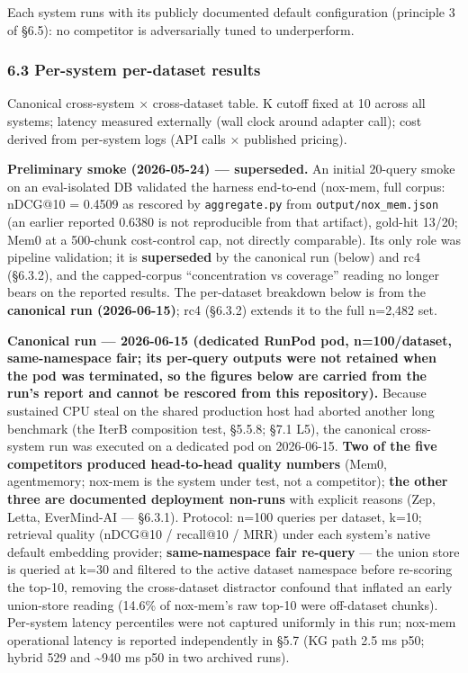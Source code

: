 \documentclass[
]{article}
\begin{document}
Each system runs with its publicly documented default configuration
(principle 3 of §6.5): no competitor is adversarially tuned to
underperform.

\subsubsection{6.3 Per-system per-dataset
results}\label{per-system-per-dataset-results}

Canonical cross-system × cross-dataset table. K cutoff fixed at 10
across all systems; latency measured externally (wall clock around
adapter call); cost derived from per-system logs (API calls × published
pricing).

\textbf{Preliminary smoke (2026-05-24) --- superseded.} An initial
20-query smoke on an eval-isolated DB validated the harness end-to-end
(nox-mem, full corpus: nDCG@10 = 0.4509 as rescored by
\texttt{aggregate.py} from \texttt{output/nox\_mem.json} (an earlier
reported 0.6380 is not reproducible from that artifact), gold-hit 13/20;
Mem0 at a 500-chunk cost-control cap, not directly comparable). Its only
role was pipeline validation; it is \textbf{superseded} by the canonical
run (below) and rc4 (§6.3.2), and the capped-corpus ``concentration vs
coverage'' reading no longer bears on the reported results. The
per-dataset breakdown below is from the \textbf{canonical run
(2026-06-15)}; rc4 (§6.3.2) extends it to the full n=2,482 set.

\textbf{Canonical run --- 2026-06-15 (dedicated RunPod pod,
n=100/dataset, same-namespace fair; its per-query outputs were not
retained when the pod was terminated, so the figures below are carried
from the run's report and cannot be rescored from this repository).}
Because sustained CPU steal on the shared production host had aborted
another long benchmark (the IterB composition test, §5.5.8; §7.1 L5),
the canonical cross-system run was executed on a dedicated pod on
2026-06-15. \textbf{Two of the five competitors produced head-to-head
quality numbers} (Mem0, agentmemory; nox-mem is the system under test,
not a competitor); \textbf{the other three are documented deployment
non-runs} with explicit reasons (Zep, Letta, EverMind-AI --- §6.3.1).
Protocol: n=100 queries per dataset, k=10; retrieval quality (nDCG@10 /
recall@10 / MRR) under each system's native default embedding provider;
\textbf{same-namespace fair re-query} --- the union store is queried at
k=30 and filtered to the active dataset namespace before re-scoring the
top-10, removing the cross-dataset distractor confound that inflated an
early union-store reading (14.6\% of nox-mem's raw top-10 were
off-dataset chunks). Per-system latency percentiles were not captured
uniformly in this run; nox-mem operational latency is reported
independently in §5.7 (KG path 2.5 ms p50; hybrid 529 and
\textasciitilde940 ms p50 in two archived runs).
\end{document}
